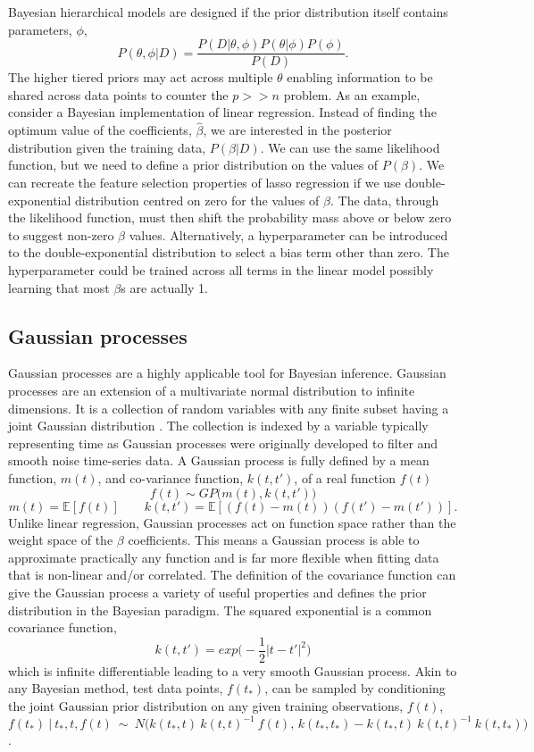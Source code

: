 \documentclass[../main.tex]{subfiles}
\begin{document}
Bayesian hierarchical models are designed if the prior distribution itself contains parameters, $\phi$, 
$$P(\theta, \phi|D) = \frac{P(D|\theta,\phi)P(\theta|\phi)P(\phi)}{P(D)}.$$
The higher tiered priors may act across multiple $\theta$ enabling information to be shared across data points to counter the $p >> n$ problem.
As an example, consider a Bayesian implementation of linear regression.
Instead of finding the optimum value of the coefficients, $\hat{\beta}$, we are interested in the posterior distribution given the training data, $P(\beta|D)$.
We can use the same likelihood function, but we need to define a prior distribution on the values of $P(\beta)$.
We can recreate the feature selection properties of lasso regression if we use double-exponential distribution centred on zero for the values of $\beta$.
The data, through the likelihood function, must then shift the probability mass above or below zero to suggest non-zero $\beta$ values.
Alternatively, a hyperparameter can be introduced to the double-exponential distribution to select a bias term other than zero.
The hyperparameter could be trained across all terms in the linear model possibly learning that most $\beta$s are actually 1.

\subsection{Gaussian processes}

Gaussian processes are a highly applicable tool for Bayesian inference.
Gaussian processes are an extension of a multivariate normal distribution to infinite dimensions.
It is a collection of random variables with any finite subset having a joint Gaussian distribution \parencite{Rasmussen2005}.
The collection is indexed by a variable typically representing time as Gaussian processes were originally developed to filter and smooth noise time-series data. 
A Gaussian process is fully defined by a mean function, $m(t)$, and co-variance function, $k(t,t')$, of a real function $f(t)$
$$f(t)\sim GP\big(m(t),k(t,t')\big)$$
$$m(t) = \mathbb{E}[f(t)] \qquad k(t,t') = \mathbb{E}[(f(t) - m(t))(f(t') - m(t'))].$$
Unlike linear regression, Gaussian processes act on function space rather than the weight space of the $\beta$ coefficients. 
This means a Gaussian process is able to approximate practically any function and is far more flexible when fitting data that is non-linear and/or correlated.
The definition of the covariance function can give the Gaussian process a variety of useful properties and defines the prior distribution in the Bayesian paradigm.
The squared exponential is a common covariance function,
$$k(t,t') = exp\big(-\frac{1}{2}|t - t'|^2\big)$$
which is infinite differentiable leading to a very smooth Gaussian process.
Akin to any Bayesian method, test data points, $f(t_{*})$, can be sampled by conditioning the joint Gaussian prior distribution on any given training observations, $f(t)$,
$$f(t_{*})\ |\ t_{*},t,f(t)\ \sim\ N\Big(k(t_{*},t)\ k(t,t)^{-1}\ f(t),\, k(t_{*},t_{*})-k(t_{*},t)\ k(t,t)^{-1}\ k(t,t_{*})\Big)$$.
\end{document}
